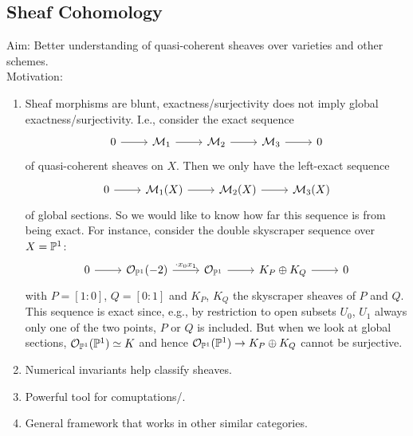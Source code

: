 \documentclass[a4paper,11pt]{article}
\begin{document}
			
		\subsection{Sheaf Cohomology}

			\noindent Aim: Better understanding of quasi-coherent sheaves over varieties and other  schemes.
			\\

			\noindent Motivation:
			\begin{enumerate}
				\item Sheaf morphisms are blunt, exactness/surjectivity does 
					not imply global exactness/surjectivity. I.e., consider the exact sequence 
					\begin{equation*}
						\begin{tikzcd}
							0\ar[r] & \M_1\ar[r] & \M_2\ar[r] & \M_3\ar[r] & 0
						\end{tikzcd}
					\end{equation*}
					of quasi-coherent sheaves on $X$. Then we only have the left-exact sequence
					\begin{equation*}
						\begin{tikzcd}
							0\ar[r] & \M_1(X)\ar[r] & \M_2(X)\ar[r] & \M_3(X)
						\end{tikzcd}
					\end{equation*}
					of global sections. So we would like to know how far this sequence is from being exact. For instance, consider the double skyscraper sequence over $X=\P^1$:
					\begin{equation*}
						\begin{tikzcd}
							0\ar[r] & \O_{\P^1}(-2)\ar[r,"\cdot x_0x_1"] & \O_{\P^1}\ar[r] & K_P\oplus K_Q\ar[r] & 0
						\end{tikzcd}
					\end{equation*}
					with $P=[1:0]$, $Q=[0:1]$ and $K_P$, $K_Q$ the skyscraper sheaves of $P$ and $Q$. This sequence is exact since, e.g., by restriction to open subsets $U_0$, $U_1$ always only one of the two points, $P$ or $Q$ is included. But when we look at global sections, $\O_{\P^1}(\P^1)\simeq K$ and hence $\O_{\P^1}(\P^1)\rightarrow K_P\oplus K_Q$ cannot be surjective.
				\item Numerical invariants help classify sheaves.
				\item Powerful tool for comuptations/.
				\item General framework that works in other similar categories.
			\end{enumerate}
\end{document}

